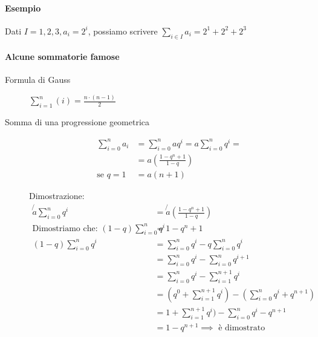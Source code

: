 \documentclass[a4paper,12pt,oneside]{article}
\begin{document}
\paragraph{Esempio} Dati $I = {1, 2, 3}, a_i = 2^i$, possiamo scrivere 
$\sum_{i \in I} a_i = 2^1 + 2^2 + 2^3$

\paragraph{Alcune sommatorie famose}
\begin{description}
    \item[Formula di Gauss] $\sum_{i=1}^n (i) = \frac{n\cdot(n-1)}{2}$
    \item[Somma di una progressione geometrica]
        \begin{align*}
            \sum_{i = 0}^n a_i &= \sum_{i = 0}^n aq^i = a \sum_{i = 0}^n q^i = \\
            &= a(\frac{1-q^n+1}{1-q}) \\
            \text{se } q = 1 \: &= a(n+1)
        \end{align*}
        
        Dimostrazione:
        \begin{align*}
            \not{a} \sum_{i=0}^n q^i &= \not{a}\left(\frac{1-q^n+1}{1-q}\right) \\
            \text{Dimostriamo che: } (1-q)\sum_{i=0}^n q^i &= 1-q^n+1 \\
            (1-q)\sum_{i=0}^n q^i &= \sum_{i=0}^n q^i - q\sum_{i=0}^n q^i \\
            &= \sum_{i=0}^n q^i - \sum_{i = 0}^{n} q^{i+1} \\
            &= \sum_{i=0}^n q^i - \sum_{i=1}^{n+1} q^i \\
            &= (q^0 + \sum_{i=1}^{n+1} q^i) - (\sum_{i=0}^n q^i + q^{n+1}) \\
            &= 1 + \sum_{i=1}^{n+1} q^i) - \sum_{i=0}^n q^i - q^{n+1} \\
            &= 1 - q^{n+1} \implies \text{ è dimostrato}
        \end{align*}
\end{description}
\end{document}
